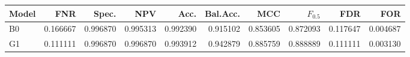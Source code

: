 \begin{tabular}{lrrrrrrrrr}
\toprule
Model & FNR & Spec. & NPV & Acc. & Bal.Acc. & MCC & $F_{0.5}$ & FDR & FOR \\
\midrule
B0 & 0.166667 & 0.996870 & 0.995313 & 0.992390 & 0.915102 & 0.853605 & 0.872093 & 0.117647 & 0.004687 \\
G1 & 0.111111 & 0.996870 & 0.996870 & 0.993912 & 0.942879 & 0.885759 & 0.888889 & 0.111111 & 0.003130 \\
\bottomrule
\end{tabular}

